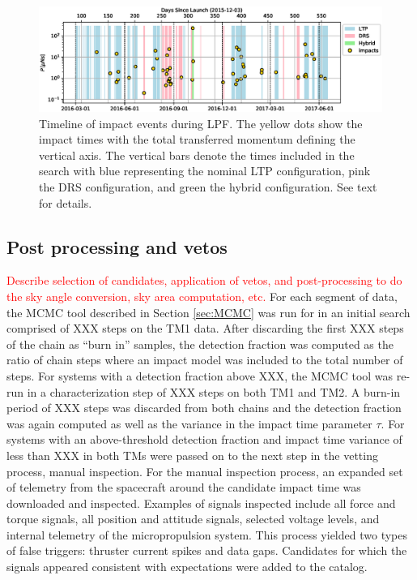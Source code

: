 \documentclass[twocolumn, trackchanges]{aastex62}
\newcommand{\red}[1]{\textcolor{red}{#1}}
\begin{document}
\begin{figure}[t]
\includegraphics[width=\textwidth]{figures/timeline.eps} 
\caption{Timeline of impact events during LPF. The yellow dots show the impact times with the total transferred momentum defining the vertical axis. The vertical bars denote the times included in the search with blue representing the nominal LTP configuration, pink the DRS configuration, and green the hybrid configuration. See text for details. \label{fig:timeline}}
\end{figure}

\subsection{Post processing and vetos}\label{sec:vetos}
\red{Describe selection of candidates, application of vetos, and post-processing to do the sky angle conversion, sky area computation, etc.}
For each segment of data, the MCMC tool described in Section \ref{sec:MCMC} was run for in an initial search comprised of XXX steps on the TM1 data. After discarding the first XXX steps of the chain as ``burn in'' samples, the detection fraction was computed as the ratio of chain steps where an impact model was included to the total number of steps.  For systems with a detection fraction above XXX, the MCMC tool was re-run in a characterization step of XXX steps on both TM1 and TM2. A burn-in period of XXX steps was discarded from both chains and the detection fraction was again computed as well as the variance in the impact time parameter $\tau$.  For systems with an above-threshold detection fraction and impact time variance of less than XXX in both TMs were passed on to the next step in the vetting process, manual inspection.  For the manual inspection process, an expanded set of telemetry from the spacecraft around the candidate impact time was downloaded and inspected.  Examples of signals inspected include all force and torque signals, all position and attitude signals, selected voltage levels, and internal telemetry of the micropropulsion system. This process yielded two types of false triggers: thruster current spikes and data gaps. Candidates for which the signals appeared consistent with expectations were added to the catalog.
\end{document}
